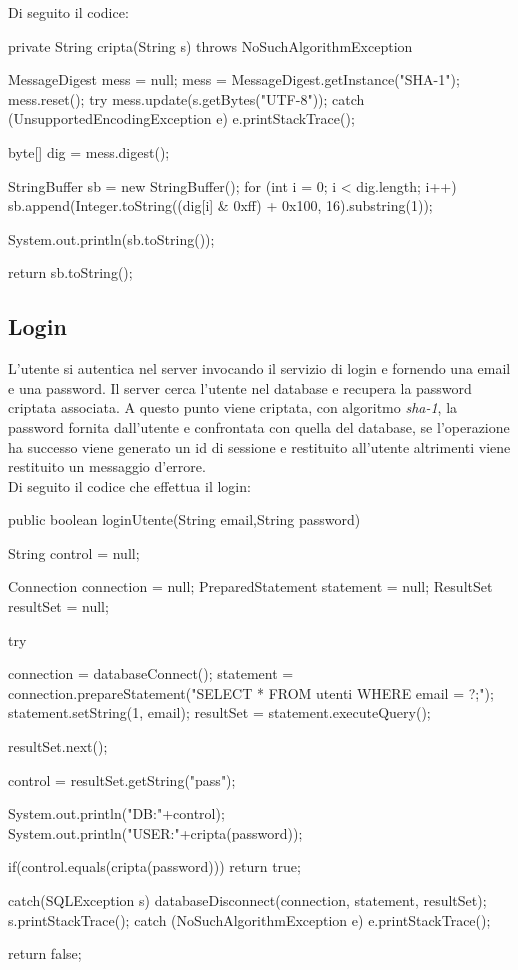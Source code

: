 \documentclass[12pt,a4]{article}
\begin{document}
Di seguito il codice:
\begin{javacode}
private String cripta(String s) throws NoSuchAlgorithmException{
		  MessageDigest mess = null;
		    mess = MessageDigest.getInstance("SHA-1");
		    mess.reset();
		    try {
				mess.update(s.getBytes("UTF-8"));
			} catch (UnsupportedEncodingException e) {
				e.printStackTrace();
			}
		    
		    byte[] dig = mess.digest();
		    
		    StringBuffer sb = new StringBuffer();
	        for (int i = 0; i < dig.length; i++) {
	          sb.append(Integer.toString((dig[i] & 0xff) + 0x100, 16).substring(1));
	        }
		    
		    System.out.println(sb.toString());
		    
		    return sb.toString();
	}
	
\end{javacode} 

\subsection{Login}
L'utente si autentica nel server invocando il servizio di login e fornendo una email e una password. Il server cerca l'utente nel database e recupera la password criptata associata. A questo punto viene criptata, con algoritmo \textit{sha-1}, la password fornita dall'utente e confrontata con quella del database, se l'operazione ha successo viene generato un id di sessione e restituito all'utente altrimenti viene restituito un messaggio d'errore. \\
Di seguito il codice che effettua il login:
\begin{javacode}
public boolean loginUtente(String email,String password){
		
		String control = null;
		
		Connection connection = null;
		PreparedStatement statement = null;
		ResultSet resultSet = null;
	    
		try{
			connection = databaseConnect();
			statement = connection.prepareStatement("SELECT * FROM utenti WHERE email = ?;");
			statement.setString(1, email);
			resultSet = statement.executeQuery();
		
			resultSet.next();
			
			control = resultSet.getString("pass");			
			
			System.out.println("DB:"+control);
			System.out.println("USER:"+cripta(password));
			
			if(control.equals(cripta(password))){
				return true;
			}
			
		}catch(SQLException s){
			databaseDisconnect(connection, statement, resultSet);
			s.printStackTrace();
		} catch (NoSuchAlgorithmException e) {
		e.printStackTrace();
	    }	
		
		return false;	
	
	}

\end{javacode}
\end{document}
